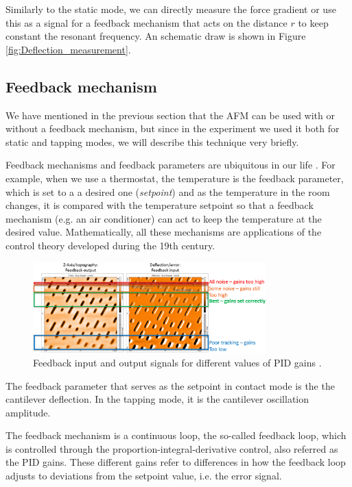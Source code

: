 \documentclass[11pt,a4paper]{article}
\begin{document}
Similarly to the static mode, we can directly measure the force gradient or use this as a signal for a feedback mechanism that acts on the distance $r$ to keep constant the resonant frequency. An schematic draw is shown in Figure \ref{fig:Deflection_measurement}.

\subsection{Feedback mechanism}\label{sec:feedback}
We have mentioned in the previous section that the AFM can be used with or without a feedback mechanism, but since in the experiment we used it both for static and tapping modes, we will describe this technique very briefly.

Feedback mechanisms and feedback parameters are ubiquitous in our life \cite{nanosurf}. For example, when we use a thermostat, the temperature is the feedback parameter, which is set to a a desired one (\emph{setpoint}) and as the temperature in the room changes, it is compared with the temperature setpoint so that a feedback mechanism (e.g. an air conditioner) can act to keep the temperature at the desired value. Mathematically, all these mechanisms are applications of the control theory developed during the 19th century.

\begin{figure}[hbt]
\centering
\includegraphics[width=0.8\textwidth]{afm-modes-feedback}
\caption{Feedback input and output signals for different values of PID gains \cite{nanosurf}.}
\label{fig:feedback}
\end{figure}

The feedback parameter that serves as the setpoint in contact mode is the the cantilever deflection. In the tapping mode, it is the cantilever oscillation amplitude.

The feedback mechanism is a continuous loop, the so-called feedback loop, which is controlled through the proportion-integral-derivative control, also referred as the PID gains. These different gains refer to differences in how the feedback loop adjusts to deviations from the setpoint value, i.e. the error signal. 
\end{document}
